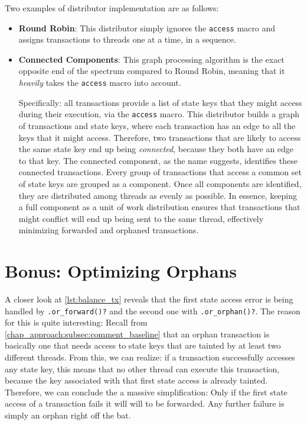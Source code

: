 Two examples of distributor implementation are as follows:

\begin{itemize}
	\item \textbf{Round Robin}: This distributor simply ignores the \texttt{access} macro and
	assigns transactions to threads one at a time, in a sequence.
	\item \textbf{Connected Components}\cite{nuutilaFindingStronglyConnected1994}: This graph
	processing algorithm is the exact opposite end of the spectrum compared to Round Robin, meaning
	that it \textit{heavily} takes the \texttt{access} macro into account.

	Specifically: all transactions provide a list of state keys
	that they might access during their execution, via the \texttt{access} macro. This distributor
	builds a graph of transactions and state keys, where each transaction has an edge to all the keys
	that it might access. Therefore, two transactions that are likely to access the same state key
	end up being \textit{connected}, because they both have an edge to that key. The connected
	component, as the name suggests, identifies these connected transactions. Every group of
	transactions that access a common set of state keys are grouped as a component. Once all
	components are identified, they are distributed among threads as evenly as possible. In essence,
	keeping a full component as a unit of work distribution ensures that transactions that might conflict will end up being sent to
	the same thread, effectively minimizing forwarded and orphaned transactions.
\end{itemize}

\section{Bonus: Optimizing Orphans} \label{chap_impl:sec:opt_orph}

A closer look at \ref{lst:balance_tx} reveals that the first state access error is being handled by
\texttt{.or\_forward()?} and the second one with \texttt{.or\_orphan()?}. The reason for this is
quite interesting: Recall from \ref{chap_approach:subsec:comment_baseline} that an orphan
transaction is basically one that needs access to state keys that are tainted by at least two
different threads. From this, we can realize: if a transaction successfully accesses any state key,
this means that no other thread can execute this transaction, because the key associated with that
first state access is already tainted. Therefore, we can conclude the a massive simplification: Only
if the first state access of a transaction fails it will will to be forwarded. Any further failure
is simply an orphan right off the bat.

